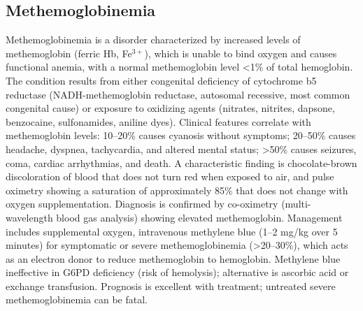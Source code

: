 \subsection{Methemoglobinemia}
\label{sec:Methemoglobinemia}
Methemoglobinemia is a disorder characterized by increased levels of methemoglobin (ferric Hb, Fe$^{3+}$), which is unable to bind oxygen and causes functional anemia, with a normal methemoglobin level <1\% of total hemoglobin. The condition results from either congenital deficiency of cytochrome b5 reductase (NADH-methemoglobin reductase, autosomal recessive, most common congenital cause) or exposure to oxidizing agents (nitrates, nitrites, dapsone, benzocaine, sulfonamides, aniline dyes). Clinical features correlate with methemoglobin levels: 10--20\% causes cyanosis without symptoms; 20--50\% causes headache, dyspnea, tachycardia, and altered mental status; >50\% causes seizures, coma, cardiac arrhythmias, and death. A characteristic finding is chocolate-brown discoloration of blood that does not turn red when exposed to air, and pulse oximetry showing a saturation of approximately 85\% that does not change with oxygen supplementation. Diagnosis is confirmed by co-oximetry (multi-wavelength blood gas analysis) showing elevated methemoglobin. Management includes supplemental oxygen, intravenous methylene blue (1--2 mg/kg over 5 minutes) for symptomatic or severe methemoglobinemia (>20--30\%), which acts as an electron donor to reduce methemoglobin to hemoglobin. Methylene blue ineffective in G6PD deficiency (risk of hemolysis); alternative is ascorbic acid or exchange transfusion. Prognosis is excellent with treatment; untreated severe methemoglobinemia can be fatal.

